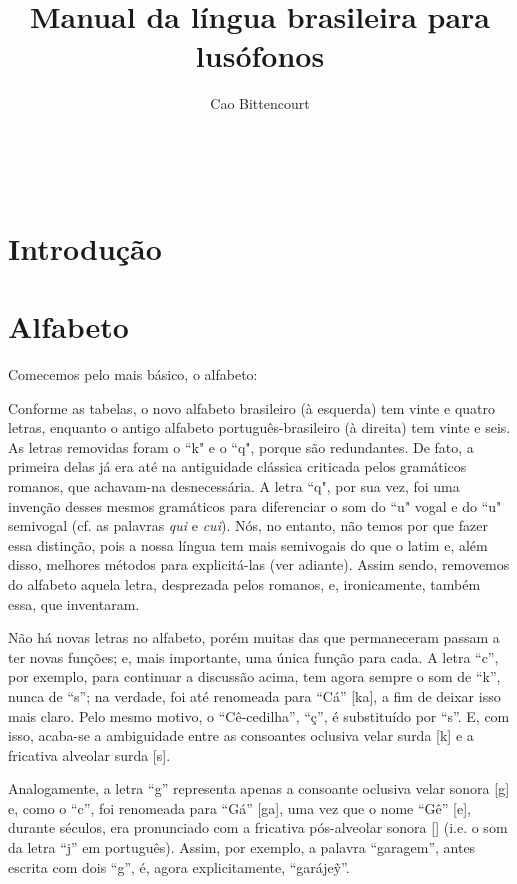 \documentclass[12pt, a5paper, titlepage]{article}
\title{Manual da língua brasileira para lusófonos}
\author{Cao Bittencourt}
\date{}
\begin{document}
\maketitle
\thispagestyle{empty}

\newpage \
\thispagestyle{empty}

\newpage

\section{Introdução}

\newpage
\section{Alfabeto}\label{pt.section.abc}
Comecemos pelo mais básico, o alfabeto:

\PtTableAbc
Conforme as tabelas, o novo alfabeto brasileiro (à esquerda) tem vinte e quatro letras, enquanto o antigo alfabeto português-brasileiro (à direita) tem vinte e seis. As letras removidas foram o ``k" e o ``q", porque são redundantes. De fato, a primeira delas já era até na antiguidade clássica criticada pelos gramáticos romanos, que achavam-na desnecessária. A letra ``q", por sua vez, foi uma invenção desses mesmos gramáticos para diferenciar o som do ``u" vogal e do ``u" semivogal (cf. as palavras \textit{qui} e \textit{cui}). Nós, no entanto, não temos por que fazer essa distinção, pois a nossa língua tem mais semivogais do que o latim e, além disso, melhores métodos para explicitá-las (ver adiante). Assim sendo, removemos do alfabeto aquela letra, desprezada pelos romanos, e, ironicamente, também essa, que inventaram.

Não há novas letras no alfabeto, porém muitas das que permaneceram passam a ter
novas funções; e, mais importante, uma única função para cada. A letra ``c'',
por exemplo, para continuar a discussão acima, tem agora sempre o som de ``k'',
nunca de ``s''; na verdade, foi até renomeada para ``Cá'' [ka], a fim de deixar
isso mais claro. Pelo mesmo motivo, o ``Cê-cedilha'', ``ç'', é substituído por
``s''. E, com isso, acaba-se a ambiguidade entre as consoantes oclusiva velar
surda [k] e a fricativa alveolar surda [s].

Analogamente, a letra ``g'' representa apenas a consoante oclusiva velar sonora
    [g] e, como o ``c'', foi renomeada para ``Gá'' [ga], uma vez que o nome ``Gê''
[\textyogh e], durante séculos, era pronunciado com a fricativa pós-alveolar
sonora [\textyogh] (i.e. o som da letra ``j'' em português). Assim, por
exemplo, a palavra ``garagem'', antes escrita com dois ``g'', é, agora
explicitamente, ``garáje\~y''.
\end{document}
